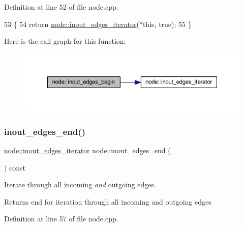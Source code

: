 Definition at line 52 of file node.\+cpp.


\begin{DoxyCode}
53 \{
54     \textcolor{keywordflow}{return} \mbox{\hyperlink{classnode_a854d596611e6a3342090cce71cedf300}{node::inout\_edges\_iterator}}(*\textcolor{keyword}{this}, \textcolor{keyword}{true});
55 \}
\end{DoxyCode}
Here is the call graph for this function\+:\nopagebreak
\begin{figure}[H]
\begin{center}
\leavevmode
\includegraphics[width=350pt]{classnode_a8677f4dc2acfb64310de1ea866c17340_cgraph}
\end{center}
\end{figure}
\mbox{\label{classnode_ad4eec3efcc3c1e572b0492276e20980c}} 
\subsubsection{\texorpdfstring{inout\+\_\+edges\+\_\+end()}{inout\_edges\_end()}}
{\footnotesize\ttfamily \mbox{\hyperlink{classnode_a854d596611e6a3342090cce71cedf300}{node\+::inout\+\_\+edges\+\_\+iterator}} node\+::inout\+\_\+edges\+\_\+end (\begin{DoxyParamCaption}{ }\end{DoxyParamCaption}) const}

Iterate through all incoming {\itshape and} outgoing edges.

\begin{DoxyReturn}{Returns}
end for iteration through all incoming and outgoing edges 
\end{DoxyReturn}


Definition at line 57 of file node.\+cpp.


